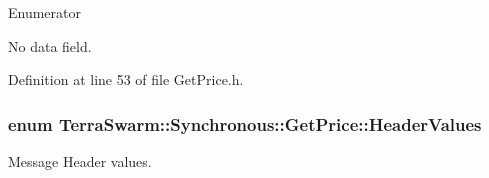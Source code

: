 \begin{Desc}
\item[Enumerator]\par
\begin{description}
\item[{\em 
\hypertarget{class_terra_swarm_1_1_synchronous_1_1_get_price_ac675c3af37b1b76c0af699178c4fbe06a6bd2ff634603aa756193e870db6762d7}{Total\-Size}\label{class_terra_swarm_1_1_synchronous_1_1_get_price_ac675c3af37b1b76c0af699178c4fbe06a6bd2ff634603aa756193e870db6762d7}
}]No data field. \end{description}
\end{Desc}


Definition at line 53 of file Get\-Price.\-h.

\hypertarget{class_terra_swarm_1_1_synchronous_1_1_get_price_a753a713a664ad54645f58aa349d74017}{
\subsubsection[{Header\-Values}]{\setlength{\rightskip}{0pt plus 5cm}enum {\bf Terra\-Swarm\-::\-Synchronous\-::\-Get\-Price\-::\-Header\-Values}\hspace{0.3cm}{\ttfamily [private]}}}\label{class_terra_swarm_1_1_synchronous_1_1_get_price_a753a713a664ad54645f58aa349d74017}


Message Header values. 

